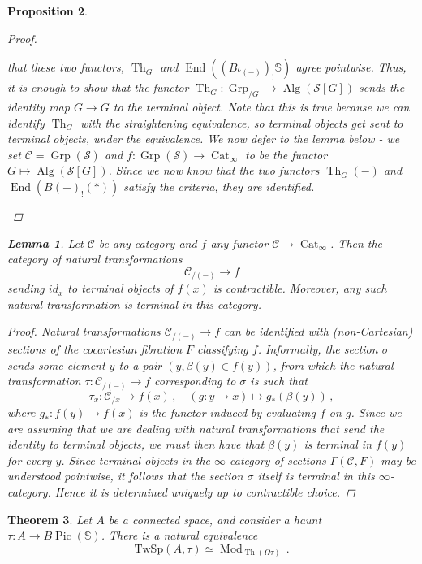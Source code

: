 \documentclass[10pt]{amsart}
\theoremstyle{plain}
\newtheorem{theorem}{Theorem}[subsection]
\newtheorem{lemma}[theorem]{Lemma}
\newtheorem{proposition}[theorem]{Proposition}
\theoremstyle{definition}
\DeclareMathOperator{\Mod}{Mod}
\DeclareMathOperator{\End}{End}
\DeclareMathOperator{\Grp}{Grp}
\DeclareMathOperator{\Th}{Th}
\DeclareMathOperator{\Pic}{Pic}
\DeclareMathOperator{\Alg}{Alg}
\DeclareMathOperator{\Cat}{Cat}
\newcommand{\bS}{\mathbb{S}}
\newcommand{\cC}{\mathcal{C}}
\newcommand{\TwSp}{\mathrm{TwSp}}
\newcommand{\cS}{\mathcal{S}}
\begin{document}
\begin{proposition}
\begin{proof}
\begin{description}
     that these two functors, $\Th_{G}$ and $\End((B\iota_{(-)})_! \bS)$ agree pointwise.
     Thus, it is enough to show that the  functor $\Th_{G}: \Grp_{/G} \to \Alg(\cS[G])$ sends the identity map $G \to G$ to the terminal object.
     Note that this is true because we can identify $\Th_{G}$ with the straightening equivalence, so terminal objects get sent to terminal objects, under the equivalence.
     We now defer to the lemma below - we set $\cC = \Grp(\cS)$ and $f: \Grp(\cS) \to \Cat_{\infty}$ to be the functor $G \mapsto \Alg(\cS[G])$.
     Since we now know that the two functors $\Th_{G}(-)$ and $\End(B(-)_!(*))$ satisfy the criteria, they are identified.
    \end{description}
\end{proof}


\begin{lemma}
    Let $\cC$ be any category and $f$ any functor $\cC \to \Cat_{\infty}$.
    Then the category of natural transformations
   \[
   \cC_{/(-)} \to f
   \]
   sending $id_x$ to terminal objects of $f(x)$ is contractible. Moreover, any such natural transformation is terminal in this category.
    \end{lemma}

    \begin{proof}
        Natural transformations $\cC_{/(-)} \to f$ can be identified with (non-Cartesian) sections of the cocartesian fibration $F$ classifying $f$.
        Informally, the section $\sigma$ sends some element $y$ to a pair $(y,\beta(y) \in f(y))$, from which the natural transformation $\tau : \cC_{/(-)} \to f$ corresponding to $\sigma$ is such that
        \[
        \tau_x : \cC_{/x} \to f(x) \,, \quad (g : y \to x) \mapsto g_*(\beta(y)) \,,
        \]
        where $g_* : f(y) \to f(x)$ is the functor induced by evaluating $f$ on $g$.
        Since we are assuming that we are dealing with natural transformations that send the identity to terminal objects, we must then have that $\beta(y)$ is terminal in $f(y)$ for every $y$.
        Since terminal objects in the $\infty$-category of sections $\Gamma(\cC, F)$ may be understood pointwise, it follows that the section $\sigma$ itself is terminal in this $\infty$-category.
        Hence it is determined uniquely up to contractible choice.
    \end{proof}
\end{proposition}

\begin{theorem} \label{thm:TwSp_Mod_natural}
  Let $A$ be a connected space, and consider a haunt $\tau : A \to B\Pic(\bS)$.
  There is a natural equivalence
  \[
  \TwSp(A,\tau) \simeq \Mod_{\Th(\Omega \tau)} \,.
  \]
\end{theorem}
\end{document}
